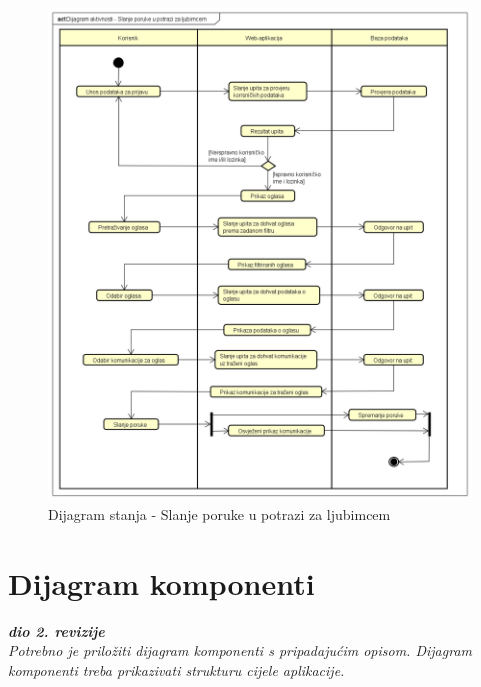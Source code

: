 			\begin{figure}[!htb]
				\centering
				\includegraphics[width=\textwidth]{slike/Dijagram_aktivnosti_-_Slanje_poruke_u_potrazi_za_ljubimcem.png}
				\caption{Dijagram stanja - Slanje poruke u potrazi za ljubimcem}
			\end{figure}
			
			\eject
		\section{Dijagram komponenti}
		
			\textbf{\textit{dio 2. revizije}}\\
		
			 \textit{Potrebno je priložiti dijagram komponenti s pripadajućim opisom. Dijagram komponenti treba prikazivati strukturu cijele aplikacije.}